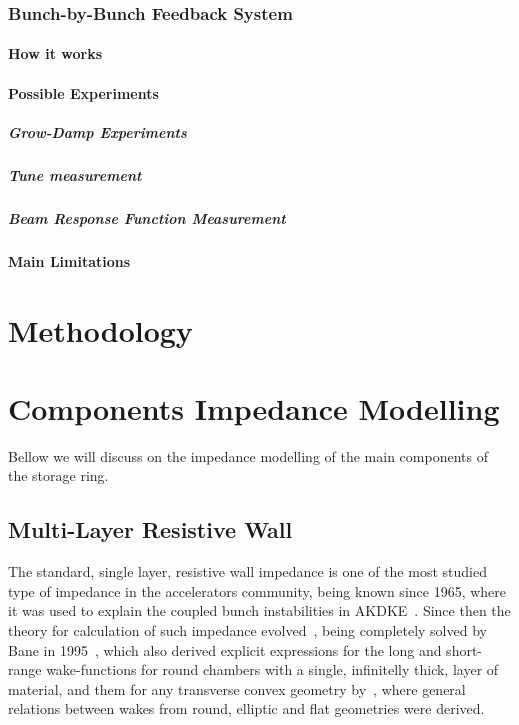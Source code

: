\subsection{Bunch-by-Bunch Feedback System}
\subsubsection{How it works}
\subsubsection{Possible Experiments}
\paragraph{Grow-Damp Experiments}
\paragraph{Tune measurement}
\paragraph{Beam Response Function Measurement}
\subsubsection{Main Limitations}

\chapter{Methodology}
\section{}


\chapter{Components Impedance Modelling}\label{cap:impedance_modelling}

    Bellow we will discuss on the impedance modelling of the main components of the storage ring.

\section{Multi-Layer Resistive Wall}

    The standard, single layer, resistive wall impedance is one of the most studied type of impedance in the accelerators community, being known since 1965, where it was used to explain the coupled bunch instabilities in AKDKE~\cite{rw1st}. Since then the theory for calculation of such impedance evolved~\cite{chao}, being completely solved by Bane in 1995~\cite{Bane1995}, which also derived explicit expressions for the long and short-range wake-functions for round chambers with a single, infinitelly thick, layer of material, and them for any transverse convex geometry by~\cite{Yokoya}, where general relations between wakes from round, elliptic and flat geometries were derived.

